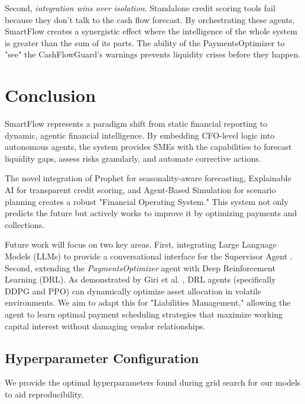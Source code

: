 \documentclass[conference]{IEEEtran}
\begin{document}
Second, \textit{integration wins over isolation}. Standalone credit scoring tools fail because they don't talk to the cash flow forecast. By orchestrating these agents, SmartFlow creates a synergistic effect where the intelligence of the whole system is greater than the sum of its parts. The ability of the PaymentsOptimizer to "see" the CashFlowGuard's warnings prevents liquidity crises before they happen.

\section{Conclusion}

SmartFlow represents a paradigm shift from static financial reporting to dynamic, agentic financial intelligence. By embedding CFO-level logic into autonomous agents, the system provides SMEs with the capabilities to forecast liquidity gaps, assess risks granularly, and automate corrective actions.

The novel integration of Prophet for seasonality-aware forecasting, Explainable AI for transparent credit scoring, and Agent-Based Simulation for scenario planning creates a robust "Financial Operating System." This system not only predicts the future but actively works to improve it by optimizing payments and collections.

Future work will focus on two key areas. First, integrating Large Language Models (LLMs) to provide a conversational interface for the Supervisor Agent \cite{jain2025}. Second, extending the \textit{PaymentsOptimizer} agent with Deep Reinforcement Learning (DRL). As demonstrated by Giri et al. \cite{giri2025}, DRL agents (specifically DDPG and PPO) can dynamically optimize asset allocation in volatile environments. We aim to adapt this for "Liabilities Management," allowing the agent to learn optimal payment scheduling strategies that maximize working capital interest without damaging vendor relationships.

\appendix

\subsection{Hyperparameter Configuration}
We provide the optimal hyperparameters found during grid search for our models to aid reproducibility.
\end{document}
